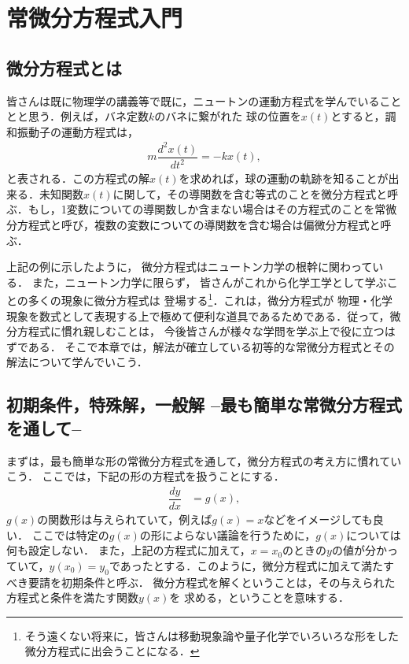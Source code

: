 \chapter{常微分方程式入門}
\section{微分方程式とは}
%
皆さんは既に物理学の講義等で既に，ニュートンの運動方程式を学んでいることとと思う．例えば，バネ定数$k$のバネに繋がれた
球の位置を$x(t)$とすると，調和振動子の運動方程式は，
\begin{align}
  m\dfrac{d^2 x(t)}{dt^2} = -kx\left(t\right), 
\end{align}
と表される．この方程式の解$x(t)$を求めれば，球の運動の軌跡を知ることが出来る．未知関数$x\left(t\right)$に関して，その導関数を含む等式のことを微分方程式と呼ぶ．もし，1変数についての導関数しか含まない場合はその方程式のことを常微分方程式と呼び，複数の変数についての導関数を含む場合は偏微分方程式と呼ぶ．

上記の例に示したように，
微分方程式はニュートン力学の根幹に関わっている．
また，ニュートン力学に限らず，
皆さんがこれから化学工学として学ぶことの多くの現象に微分方程式は
登場する\footnote{そう遠くない将来に，皆さんは移動現象論や量子化学でいろいろな形をした微分方程式に出会うことになる．}．これは，微分方程式が
物理・化学現象を数式として表現する上で極めて便利な道具であるためである．従って，微分方程式に慣れ親しむことは，
今後皆さんが様々な学問を学ぶ上で役に立つはずである．
そこで本章では，解法が確立している初等的な常微分方程式とその解法について学んでいこう．

%
\section{初期条件，特殊解，一般解 –最も簡単な常微分方程式を通して–}
まずは，最も簡単な形の常微分方程式を通して，微分方程式の考え方に慣れていこう．
ここでは，下記の形の方程式を扱うことにする．
\begin{align}
 \dfrac{dy}{dx} &= g(x), \label{eq:PDE_01} 
\end{align}
$g(x)$の関数形は与えられていて，例えば$g(x) = x$などをイメージしても良い．
ここでは特定の$g(x)$の形によらない議論を行うために，$g(x)$については何も設定しない．
また，上記の方程式に加えて，$x = x_0$のときの$y$の値が分かっていて，$y\left(x_0\right) = y_{0}$であったとする．このように，微分方程式に加えて満たすべき要請を初期条件と呼ぶ．
微分方程式を解くということは，その与えられた方程式と条件を満たす関数$y\left(x\right)$を
求める，ということを意味する．

